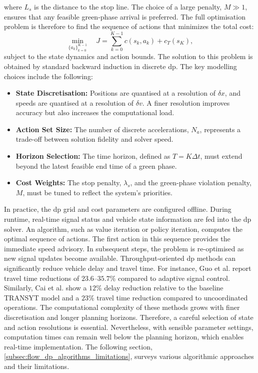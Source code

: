 where $L_s$ is the distance to the stop line. The choice of a large penalty, $M\gg1$, ensures that any feasible green-phase arrival is preferred.
\mynewline
The full optimisation problem is therefore to find the sequence of actions that minimizes the total cost:
\begin{equation*}
    \min_{\{a_k\}_{k=0}^{K-1}} \quad J = \sum_{k=0}^{K-1} c(s_k,a_k) + c_T(s_K),
\end{equation*}
subject to the state dynamics and action bounds. The solution to this problem is obtained by standard backward induction in discrete \ac{dp}.
\mynewline
The key modelling choices include the following:
\begin{itemize}
    \item \textbf{State Discretisation:} Positions are quantised at a resolution of $\delta x$, and speeds are quantised at a resolution of $\delta v$. A finer resolution improves accuracy but also increases the computational load.
    \item \textbf{Action Set Size:} The number of discrete accelerations, $N_a$, represents a trade-off between solution fidelity and solver speed.
    \item \textbf{Horizon Selection:} The time horizon, defined as $T=K\Delta t$, must extend beyond the latest feasible end time of a green phase.
    \item \textbf{Cost Weights:} The stop penalty, $\lambda_s$, and the green-phase violation penalty, $M$, must be tuned to reflect the system's priorities.
\end{itemize}
In practice, the \ac{dp} grid and cost parameters are configured offline. During runtime, real-time signal status and vehicle state information are fed into the \ac{dp} solver. An algorithm, such as value iteration or policy iteration, computes the optimal sequence of actions. The first action in this sequence provides the immediate speed advisory. In subsequent steps, the problem is re-optimised as new signal updates become available.
\mynewline
Throughput-oriented \ac{dp} methods can significantly reduce vehicle delay and travel time. For instance, Guo et al. \cite{Guo2019} report travel time reductions of $23.6$--$35.7\%$ compared to adaptive signal control. Similarly, Cai et al. \cite{Cai2008} show a $12\%$ delay reduction relative to the baseline TRANSYT model and a $23\%$ travel time reduction compared to uncoordinated operations. The computational complexity of these methods grows with finer discretisation and longer planning horizons. Therefore, a careful selection of state and action resolutions is essential. Nevertheless, with sensible parameter settings, computation times can remain well below the planning horizon, which enables real-time implementation. The following section, \vref{subsec:flow_dp_algorithms_limitations}, surveys various algorithmic approaches and their limitations.

